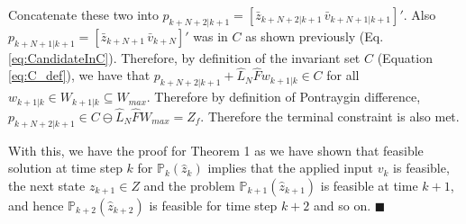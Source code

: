 Concatenate these two into $p_{k+N+2|k+1} = [\bar{z}_{k+N+2|k+1}\, \bar{v}_{k+N+1|k+1}]'$. Also $p_{k+N+1|k+1} = [\bar{z}_{k+N+1} \,\bar{v}_{k+N}]'$ was in $C$ as shown previously (Eq. \ref{eq:CandidateInC}). Therefore, by definition of the invariant set $C$ (Equation \ref{eq:C_def}), we have that $p_{k+N+2|k+1} + \hat{L}_N \hat{F} w_{k+1|k}\in C$ for all $w_{k+1|k}\in W_{k+1|k} \subseteq W_{max}$. Therefore by definition of Pontraygin difference, $p_{k+N+2|k+1} \in C \ominus \hat{L}_N\hat{F}W_{max} = Z_f$. Therefore the terminal constraint is also met.

With this, we have the proof for Theorem 1 as we have shown that feasible solution at time step $k$ for $\mathbb{P}_{k}(\hat{z}_{k}) $ implies that the applied input $v_k$ is feasible, the next state $z_{k+1} \in Z$ and the problem $\mathbb{P}_{k+1}(\hat{z}_{k+1}) $ is feasible at time $k+1$, and hence  $\mathbb{P}_{k+2}(\hat{z}_{k+2}) $ is feasible for time step $k+2$ and so on. $\blacksquare$






